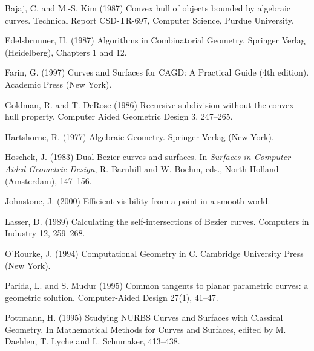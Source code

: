 \documentclass[9pt,twocolumn]{article}
\newif\ifJournal
\begin{document}

\begin{thebibliography}{Lozano-Perez 83}

Bajaj, C. and M.-S. Kim (1987)
Convex hull of objects bounded by algebraic curves.
Technical Report CSD-TR-697, Computer Science, Purdue University.

Edelsbrunner, H. (1987)
Algorithms in Combinatorial Geometry.
Springer Verlag (Heidelberg), Chapters 1 and 12.

Farin, G. (1997)
Curves and Surfaces for CAGD: A Practical Guide (4th edition).
Academic Press (New York).

Goldman, R. and T. DeRose (1986)
Recursive subdivision without the convex hull property.
Computer Aided Geometric Design 3, 247--265.

Hartshorne, R. (1977)
Algebraic Geometry.
Springer-Verlag (New York).

Hoschek, J. (1983)
Dual Bezier curves and surfaces.
In {\em Surfaces in Computer Aided Geometric Design},
R. Barnhill and W. Boehm, eds.,
North Holland (Amsterdam), 147--156.

Johnstone, J. (2000)
Efficient visibility from a point in a smooth world.


Lasser, D. (1989)
Calculating the self-intersections of Bezier curves.
Computers in Industry 12, 259--268.

O'Rourke, J. (1994)
Computational Geometry in C.
Cambridge University Press (New York).

Parida, L. and S. Mudur (1995)
Common tangents to planar parametric curves: a geometric solution.
Computer-Aided Design 27(1), 41--47.

Pottmann, H. (1995)
Studying NURBS Curves and Surfaces with Classical Geometry.
In Mathematical Methods for Curves and Surfaces,
edited by M. Daehlen, T. Lyche and L. Schumaker,
413--438.

\ifJournal
\bibitem[Pottmann 99]{pottmann99}
Pottmann, H. and M. Peternell and B. Ravani (1999)
An introduction to line geometry with applications.
Computer-Aided Design 31, 3--16.
\fi


\end{thebibliography}
\end{document}
